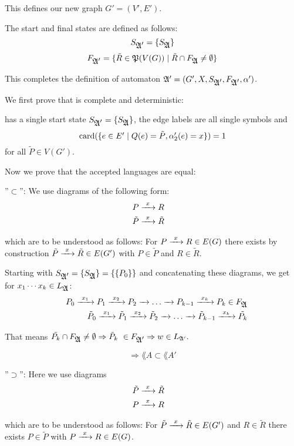 This defines our new graph $G' = (V', E')$.

The start and final states are defined as follows:
\[ S_{\mbox{$\mathfrak{A'}$}} = \mbox{$\{S_{\mbox{$\mathfrak{A}$}}\}$} \]
\[ F_{\mbox{$\mathfrak{A'}$}} = \mbox{$\{\tilde{R} \in \mathfrak{P}(V(G)) \mid \tilde{R} \cap
F_{\mbox{$\mathfrak{A}$}} \neq \emptyset\}$} \]

This completes the definition of automaton $\mbox{$\mathfrak{A'}$} = (G', X,
S_{\mbox{$\mathfrak{A'}$}}, F_{\mbox{$\mathfrak{A'}$}}, \alpha')$.

We first prove that
 is complete and deterministic:

 has a single start state $S_{\mbox{$\mathfrak{A'}$}} = \mbox{$\{S_{\mbox{$\mathfrak{A}$}}\}$}$, 
the edge labels are all single symbols and 
\[ \mathrm{card}(\mbox{$\{e \in E' \mid Q(e) = \tilde{P}, \alpha'_2(e) = x\}$}) = 1 \]
for all $\tilde{P} \in V(G')$.

Now we prove that the accepted languages are equal:

''$\subset$'': We use diagrams of the following form:
\begin{eqnarray*}
& P \xrightarrow{\ {x}\ } R & \\
& \tilde{P} \xrightarrow{\ {x}\ } \tilde{R} &
\end{eqnarray*}

which are to be understood as follows: For $P \xrightarrow{\ {x}\ } R \in E(G)$
there exists by construction $\tilde{P} \xrightarrow{\ {x}\ } \tilde{R} \in
E(G')$ with $P \in \tilde{P}$ and $R \in \tilde{R}$.

Starting with $S_{\mbox{$\mathfrak{A'}$}} = \mbox{$\{S_{\mbox{$\mathfrak{A}$}}\}$} = \mbox{$\{\mbox{$\{P_0 \}$}\}$}$ and
concatenating these diagrams, we get for $x_1 \cdots x_k \in
L_{\mbox{$\mathfrak{A}$}}$:
\begin{eqnarray*}
 & & P_0 \xrightarrow{\ {x_1}\ } P_1 \xrightarrow{\ {x_2}\ } P_2 \xrightarrow{\ {}\ } \ldots \xrightarrow{\ {}\ } P_{k-1} \xrightarrow{\ {x_k}\ }
 P_k \in F_{\mbox{$\mathfrak{A}$}} \\
 & & \tilde{P}_0 \xrightarrow{\ {x_1}\ } \tilde{P}_1 \xrightarrow{\ {x_2}\ } \tilde{P}_2 \xrightarrow{\ {}\ } \ldots
 \xrightarrow{\ {}\ } \tilde{P}_{k-1} \xrightarrow{\ {x_k}\ } \tilde{P_k}
\end{eqnarray*}

That means $\tilde{P_k} \cap F_{\mbox{$\mathfrak{A}$}} \neq \emptyset \Rightarrow \tilde{P}_k \
\in F_{\mbox{$\mathfrak{A'}$}} \Rightarrow w \in \mbox{$L_{\mathfrak{A'}}$}.$

\[ \Rightarrow \lang{A} \subset \lang{A'}\]

''$\supset$'': Here we use diagrams  
\begin{eqnarray*}
& \tilde{P} \xrightarrow{\ {x}\ } \tilde{R} & \\
& P \xrightarrow{\ {x}\ } R & 
\end{eqnarray*}

which are to be understood as follows: For $\tilde{P} \xrightarrow{\ {x}\ } \tilde{R} \in
E(G')$ and $R \in \tilde{R}$ there exists $P \in \tilde{P}$ with $P \xrightarrow{\ {x}\ } R
\in E(G)$.

